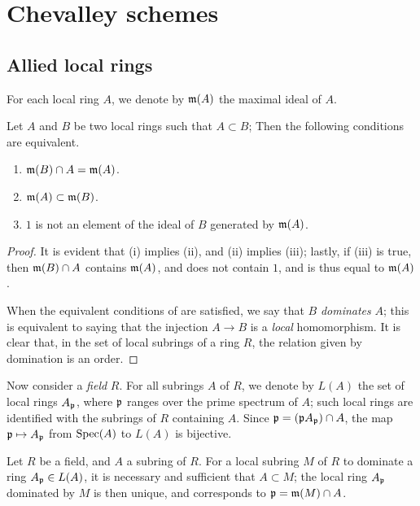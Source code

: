 \section{Chevalley schemes}
\label{section-chevalley-schemes}

\subsection{Allied local rings}
\label{subsection-allied-local-rings}

For each local ring $A$, we denote by $\mathfrak{m}(A)$ the maximal ideal of $A$.

\begin{lem}[8.1.1]
\label{1.8.1.1}
Let $A$ and $B$ be two local rings such that $A\subset B$;
Then the following conditions are equivalent.
\begin{enumerate}[label=\emph{(\roman*)}]
    \item $\mathfrak{m}(B)\cap A=\mathfrak{m}(A)$.
    \item $\mathfrak{m}(A)\subset\mathfrak{m}(B)$.
    \item $1$ is not an element of
the ideal of $B$ generated by $\mathfrak{m}(A)$.
\end{enumerate}
\end{lem}

\begin{proof}
\label{proof-1.8.1.1}
It is evident that (i) implies (ii), and (ii) implies (iii);
lastly, if (iii) is true, then $\mathfrak{m}(B)\cap A$ contains $\mathfrak{m}(A)$, and does not contain $1$, and is thus equal to $\mathfrak{m}(A)$.

When the equivalent conditions of  are satisfied, we say that $B$ \emph{dominates} $A$;
this is equivalent to saying that the injection $A\to B$ is a \emph{local} homomorphism.
It is clear that, in the set of local subrings of a ring $R$, the relation given by domination is an order.
\end{proof}

\begin{env}[8.1.2]
\label{1.8.1.2}
Now consider a \emph{field} $R$.
For all subrings $A$ of $R$, we denote by $L(A)$ the set of local rings $A_\mathfrak{p}$, where $\mathfrak{p}$ ranges over the prime spectrum of $A$;
such local rings are identified with the subrings of $R$ containing $A$.
Since $\mathfrak{p}=(\mathfrak{p}A_\mathfrak{p})\cap A$, the map $\fk{p}\mapsto A_\fk{p}$ from ${\mathop{\mathrm{Spec}}\nolimits}(A)$ to $L(A)$ is bijective.
\end{env}

\begin{lem}[8.1.3]
\label{1.8.1.3}
Let $R$ be a field, and $A$ a subring of $R$.
For a local subring $M$ of $R$ to dominate a ring $A_\mathfrak{p}\in L(A)$, it is necessary and sufficient that $A\subset M$;
the local ring $A_\mathfrak{p}$ dominated by $M$ is then unique, and corresponds to $\mathfrak{p}=\mathfrak{m}(M)\cap A$.
\end{lem}

